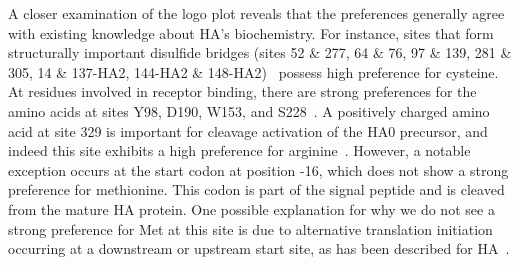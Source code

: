 \documentclass[11pt]{article}
\begin{document}
A closer examination of the logo plot reveals that the preferences generally agree with existing knowledge about HA's biochemistry.
For instance, sites that form structurally important disulfide bridges (sites 52 \& 277, 64 \& 76, 97 \& 139, 281 \& 305, 14 \& 137-HA2, 144-HA2 \& 148-HA2)~\citep{waterfield1981disulphide} possess high preference for cysteine.
At residues involved in receptor binding, there are strong preferences for the amino acids at sites Y98, D190, W153, and S228~\citep{weis1988structure,martin1998studies}.
A positively charged amino acid at site 329 is important for cleavage activation of the HA0 precursor, and indeed this site exhibits a high preference for arginine~\citep{kido1992isolation, stech2005new}.
However, a notable exception occurs at the start codon at position -16, which does not show a strong preference for methionine. 
This codon is part of the signal peptide and is cleaved from the mature HA protein.
One possible explanation for why we do not see a strong preference for Met at this site is due to alternative translation initiation occurring at a downstream or upstream start site, as has been described for HA~\citep{girard2011upstream}.
\end{document}
